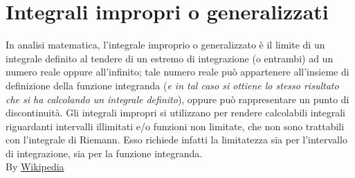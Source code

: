 \section{Integrali impropri o generalizzati}
In analisi matematica, l'integrale improprio o generalizzato è il limite di un integrale definito al tendere di un estremo di integrazione (o entrambi) ad un numero reale oppure all'infinito; tale numero reale può appartenere all'insieme di definizione della funzione integranda (\textit{e in tal caso si ottiene lo stesso risultato che si ha calcolando un integrale definito}), oppure può rappresentare un punto di discontinuità. Gli integrali impropri si utilizzano per rendere calcolabili integrali riguardanti intervalli illimitati e/o funzioni non limitate, che non sono trattabili con l'integrale di Riemann. Esso richiede infatti la limitatezza sia per l'intervallo di integrazione, sia per la funzione integranda.\\ By \href{https://it.wikipedia.org/wiki/Integrale_improprio}{Wikipedia}
